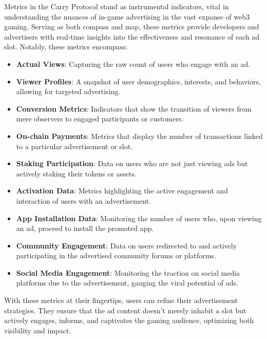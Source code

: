 Metrics in the Carry Protocol stand as instrumental indicators, vital in understanding the nuances of in-game advertising in the vast expanse of web3 gaming. Serving as both compass and map, these metrics provide developers and advertisers with real-time insights into the effectiveness and resonance of each ad slot. Notably, these metrics encompass:

\begin{itemize}
    \item \textbf{Actual Views}: Capturing the raw count of users who engage with an ad.
    \item \textbf{Viewer Profiles}: A snapshot of user demographics, interests, and behaviors, allowing for targeted advertising.
    \item \textbf{Conversion Metrics}: Indicators that show the transition of viewers from mere observers to engaged participants or customers.
    \item \textbf{On-chain Payments}: Metrics that display the number of transactions linked to a particular advertisement or slot.
    \item \textbf{Staking Participation}: Data on users who are not just viewing ads but actively staking their tokens or assets.
    \item \textbf{Activation Data}: Metrics highlighting the active engagement and interaction of users with an advertisement.
    \item \textbf{App Installation Data}: Monitoring the number of users who, upon viewing an ad, proceed to install the promoted app.
    \item \textbf{Community Engagement}: Data on users redirected to and actively participating in the advertised community forums or platforms.
    \item \textbf{Social Media Engagement}: Monitoring the traction on social media platforms due to the advertisement, gauging the viral potential of ads.
\end{itemize}

With these metrics at their fingertips, users can refine their advertisement strategies. They ensure that the ad content doesn't merely inhabit a slot but actively engages, informs, and captivates the gaming audience, optimizing both visibility and impact.




